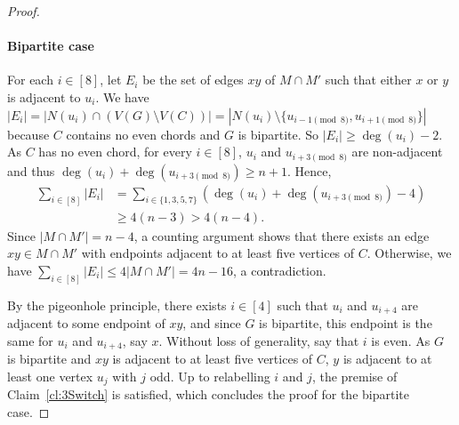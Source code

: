 \documentclass[11pt,a4paper]{article}
\theoremstyle{definition}
\begin{document}
\begin{proof}
  \paragraph{Bipartite case}
  For each $i \in [8]$, let $E_i$ be the set of edges
  $xy$ of $M\cap M'$ such that either $x$ or $y$ is adjacent to $u_i$.  We have
  $|E_i| = |N(u_i) \cap (V(G) \setminus V(C))| = |N(u_i) \setminus \{u_{i-1 \pmod
    8}, u_{i+1 \pmod 8}\}|$ because $C$ contains no even chords and $G$ is bipartite. So
  $|E_i| \ge \deg(u_i) - 2$. As $C$ has no even chord, for every $i \in [8]$, $u_i$ and $u_{i+3\pmod 8}$ are non-adjacent and thus $\deg(u_i) + \deg(u_{i+3\pmod 8}) \ge n+1$. Hence, 
  \begin{align*}
      \sum_{i \in [8]} |E_i|  &= \sum_{i \in \{1,3,5,7\}} (\deg(u_i)+\deg(u_{i+3 \pmod 8}) -4)\\
      &\ge 4(n-3) > 4(n -4).
      \end{align*}
  Since $|M \cap M'| = n-4$, a counting
  argument shows that there exists an edge $xy \in M \cap M'$ with endpoints
  adjacent to at least five vertices of $C$. Otherwise, we have
  $\sum_{i \in [8]} |E_i| \le 4|M \cap M'| = 4n -16$, a contradiction.
  
  By the pigeonhole principle, there exists $i \in [4]$
  such that $u_i$ and $u_{i+4}$ are adjacent to some endpoint of $xy$, and since
  $G$ is bipartite, this endpoint is the same for $u_i$ and $u_{i+4}$, say
  $x$. Without loss of generality, say that $i$ is even. As $G$ is bipartite and
  $xy$ is adjacent to at least five vertices of $C$, $y$ is adjacent to at least one
  vertex $u_j$ with $j$ odd. Up to relabelling $i$ and $j$, the premise of
  Claim~\ref{cl:3Switch} is satisfied, which concludes the proof for the bipartite
  case.


\end{proof}
\end{document}
